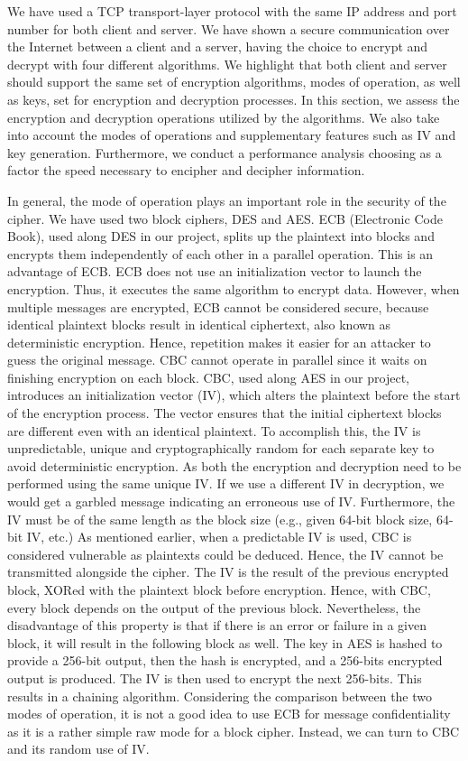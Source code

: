 We have used a TCP transport-layer protocol with the same IP address and port number for both client and server. We have shown a secure communication over the Internet between a client and a server, having the choice to encrypt and decrypt with four different algorithms. We highlight that both client and server should support the same set of encryption algorithms, modes of operation, as well as keys, set for encryption and decryption processes. In this section, we assess the encryption and decryption operations utilized by the algorithms. We also take into account the modes of operations and supplementary features such as IV and key generation. Furthermore, we conduct a performance analysis choosing as a factor the speed necessary to encipher and decipher information. 

In general, the mode of operation plays an important role in the security of the cipher. We have used two block ciphers, DES and AES. ECB (Electronic Code Book), used along DES in our project, splits up the plaintext into blocks and encrypts them independently of each other in a parallel operation. This is an advantage of ECB. ECB does not use an initialization vector to launch the encryption. Thus, it executes the same algorithm to encrypt data. However, when multiple messages are encrypted, ECB cannot be considered secure, because identical plaintext blocks result in identical ciphertext, also known as deterministic encryption. Hence, repetition makes it easier for an attacker to guess the original message. CBC cannot operate in parallel since it waits on finishing encryption on each block. CBC, used along AES in our project, introduces an initialization vector (IV), which alters the plaintext before the start of the encryption process. The vector ensures that the initial ciphertext blocks are different even with an identical plaintext. To accomplish this, the IV is unpredictable, unique and cryptographically random for each separate key to avoid deterministic encryption. As both the encryption and decryption need to be performed using the same unique IV.  If we use a different IV in decryption, we would get a garbled message indicating an erroneous use of IV. Furthermore, the IV must be of the same length as the block size (e.g., given 64-bit block size, 64-bit IV, etc.) As mentioned earlier, when a predictable IV is used, CBC is considered vulnerable as plaintexts could be deduced. Hence, the IV cannot be transmitted alongside the cipher. The IV is the result of the previous encrypted block, XORed with the plaintext block before encryption. Hence, with CBC, every block depends on the output of the previous block. Nevertheless, the disadvantage of this property is that if there is an error or failure in a given block, it will result in the following block as well. The key in AES is hashed to provide a 256-bit output, then the hash is encrypted, and a 256-bits encrypted output is produced. The IV is then used to encrypt the next 256-bits. This results in a chaining algorithm.
Considering the comparison between the two modes of operation, it is not a good idea to use ECB for message confidentiality as it is a rather simple raw mode for a block cipher. Instead, we can turn to CBC and its random use of IV. 

